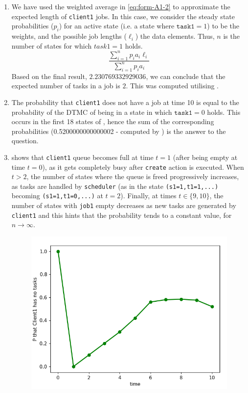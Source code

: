 \documentclass{report}
\begin{document}
\begin{enumerate}
\begin{enumerate}
  \item We have used the weighted average in \cref{eq:form-A1-2} to approximate the expected length of \verb|client1| jobs. In this case, we consider the steady state probabilities ($p_{i}$) for an active state (i.e. a state where $\mathtt{task1}=1$) to be the weights, and the possible job lengths ($\ell_{i}$) the data elements. Thus, $n$ is the number of states for which $task1 = 1$ holds.
    \begin{equation}
      \label{eq:form-A1-2}
      \frac{ \sum_{i=1}^{n}p_{i}a_{i} \ell_{i}}{ \sum_{i=1}^{n}p_{i}a_{i}}
    \end{equation}
    Based on the final result, $2.230769332929036$, we can conclude that the expected number of tasks in a job is $2$. This was computed utilising .
  \item The probability that \verb|client1| does not have a job at time 10 is equal to the probability of the DTMC of being in a state in which $\mathtt{task1} = 0$ holds. This occurs in the first 18 states of , hence the sum of the corresponding probabilities (0.5200000000000002 - computed by ) is the answer to the question.
  \item {}  shows that \verb|client1| queue becomes full at time $t=1$ (after being empty at time $t=0$), as it gets completely busy after \texttt{create} action is executed. When $t>2$, the number of states where the queue is freed progressively increases, as tasks are handled by \texttt{scheduler} (as in the state \texttt{(s1=1,t1=1,...)} becoming \texttt{(s1=1,t1=0,...)} at $t=2$). Finally, at times $t \in \{9,10\}$, the number of states with \texttt{job1} empty decreases as new tasks are generated by \texttt{client1} and this hints that the probability tends to a constant value, for $n \rightarrow \infty$.
    \begin{figure}[h]
      \begin{center}
        \includegraphics[width=.7\textwidth]{./code/results/a12d-plot.png}

\end{center}
\end{figure}
\end{enumerate}
\end{enumerate}
\end{document}

